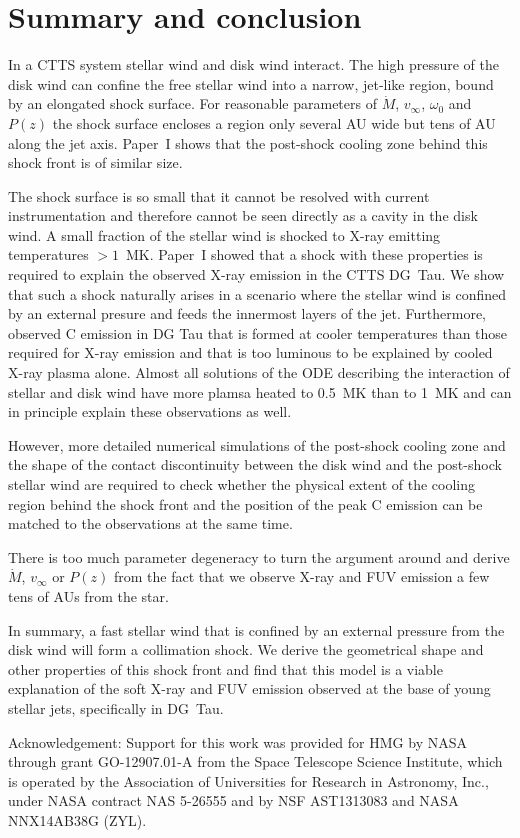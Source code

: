 \section{Summary and conclusion}
\label{sect:conclusion}
In a CTTS system stellar wind and disk wind interact. The high pressure of the disk wind can confine the free stellar wind into a narrow, jet-like region, bound by an elongated shock surface. For reasonable parameters of $\dot M$, $v_\infty$, $\omega_0$ and $P(z)$ the shock surface encloses a region only several AU wide but tens of AU along the jet axis. 
Paper~I shows that the post-shock cooling zone behind this shock front is of similar size.
 
The shock surface is so small that it cannot be resolved with current instrumentation and therefore cannot be seen directly as a cavity in the disk wind. A small fraction of the stellar wind is shocked to X-ray emitting temperatures $>1$~MK. 
Paper~I showed that a shock with these properties is required to explain the observed X-ray emission in the CTTS DG~Tau. We show that such a shock naturally arises in a scenario where the stellar wind is confined by an external presure and feeds the innermost layers of the jet.
Furthermore, \citet{2013A&A...550L...1S} observed C emission in DG Tau that is formed at cooler temperatures than those required for X-ray emission and that is too luminous to be explained by cooled X-ray plasma alone. Almost all solutions of the ODE describing the interaction of stellar and disk wind have more plamsa heated to 0.5~MK than to 1~MK and can in principle explain these observations as well.

However, more detailed numerical simulations of the post-shock cooling zone and the shape of the contact discontinuity between the disk wind and the post-shock stellar wind are required to check whether the physical extent of the cooling region behind the shock front and the position of the peak  C emission can be matched to the observations at the same time.

There is too much parameter degeneracy to turn the argument around and derive $\dot M$, $v_\infty$ or $P(z)$ from the fact that we observe X-ray and FUV emission a few tens of AUs from the star.

In summary, a fast stellar wind that is confined by an external pressure from the disk wind will form a collimation shock. We derive the geometrical shape and other properties of this shock front and find that this model is a viable explanation of the soft X-ray and FUV emission observed at the base of young stellar jets, specifically in DG~Tau.

Acknowledgement: Support for this work was provided for HMG by NASA through grant GO-12907.01-A from the Space Telescope Science Institute, which is operated by the Association of Universities for Research in Astronomy, Inc., under NASA contract NAS 5-26555 and by NSF AST1313083 and NASA NNX14AB38G (ZYL).